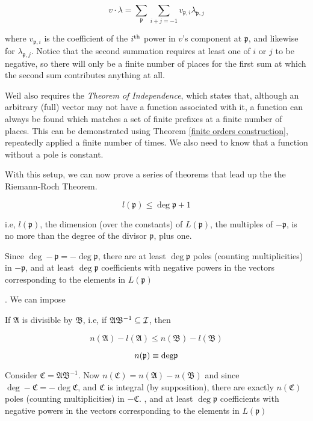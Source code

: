 $$ v \cdot \lambda = \sum_\mathfrak{p} \sum_{i+j=-1} v_{\mathfrak{p},i}
  \lambda_{\mathfrak{p},j} $$

where $v_{\mathfrak{p},i}$ is the coefficient of the $i^{\rm th}$
power in $v$'s component at $\mathfrak{p}$, and likewise for
$\lambda_{\mathfrak{p},j}$.  Notice that the second summation requires
at least one of $i$ or $j$ to be negative, so there will only be a
finite number of places for the first sum at which the second sum
contributes anything at all.

Weil also requires the {\it Theorem of Independence}, which states
that, although an arbitrary (full) vector may not have a function
associated with it, a function can always be found which matches a set
of finite prefixes at a finite number of places.  This can be
demonstrated using Theorem \ref{finite orders construction},
repeatedly applied a finite number of times.  We also need to know
that a function without a pole is constant.

With this setup, we can now prove a series of theorems that lead up
the the Riemann-Roch Theorem.

\theorem

$$l(\mathfrak{p}) \leq \deg \mathfrak{p} +1$$

i.e, $l(\mathfrak{p})$, the dimension (over the constants) of
$L(\mathfrak{p})$, the multiples of $-\mathfrak{p}$, is no more than
the degree of the divisor $\mathfrak{p}$, plus one.

\proof

Since $\deg -\mathfrak{p} = - \deg \mathfrak{p}$, there are at least
$\deg \mathfrak{p}$ poles (counting multiplicities) in
$-\mathfrak{p}$, and at least $\deg \mathfrak{p}$
coefficients with negative powers in the vectors corresponding
to the elements in $L(\mathfrak{p})$

.  We can impose

\endtheorem

\theorem

If $\mathfrak{A}$ is divisible by $\mathfrak{B}$, i.e, if
$\mathfrak{A}\mathfrak{B}^{-1} \subseteq {\cal I}$, then

$$n(\mathfrak{A}) - l(\mathfrak{A}) \leq n(\mathfrak{B}) - l(\mathfrak{B}) $$

$$n(\mathfrak{p}) \equiv {\rm deg} \mathfrak{p}$$

\proof

Consider $\mathfrak{C} = \mathfrak{A}\mathfrak{B}^{-1}$.
Now $n(\mathfrak{C}) = n(\mathfrak{A}) - n(\mathfrak{B})$ and since
$\deg -\mathfrak{C} = - \deg \mathfrak{C}$, and
$\mathfrak{C}$ is integral (by supposition),
there are exactly
$n(\mathfrak{C})$ poles (counting multiplicities) in $-\mathfrak{C}$.
, and at least $\deg \mathfrak{p}$
coefficients with negative powers in the vectors corresponding
to the elements in $L(\mathfrak{p})$

